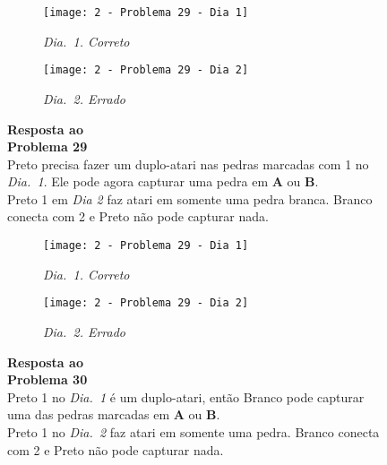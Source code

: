 \begin{SCfigure}[][h!]
    \begin{subfigure}[t]{.31\textwidth}
        \texttt{[image: 2 - Problema 29 - Dia 1]}
        \caption*{\emph{Dia.\@~1. Correto}}
    \end{subfigure}
    \hfill
    \begin{subfigure}[t]{.31\textwidth}
        \texttt{[image: 2 - Problema 29 - Dia 2]}
        \caption*{\emph{Dia.\@~2. Errado}}
    \end{subfigure}
    \hfill
    \caption*{\textbf{Resposta ao\\Problema 29}\\\vspace*{.25cm}Preto precisa fazer um duplo-atari  nas pedras marcadas com 1 no \emph{Dia.\@~1}. Ele pode agora capturar uma pedra em \textbf{A} ou \textbf{B}.\\\vspace*{.25cm}Preto 1 em \emph{Dia 2} faz atari em somente uma pedra branca. Branco conecta com 2 e Preto não pode capturar nada.}
\end{SCfigure}

\vfill

\begin{SCfigure}[][h!]
    \begin{subfigure}[t]{.31\textwidth}
        \texttt{[image: 2 - Problema 29 - Dia 1]}
        \caption*{\emph{Dia.\@~1. Correto}}
    \end{subfigure}
    \hfill
    \begin{subfigure}[t]{.31\textwidth}
        \texttt{[image: 2 - Problema 29 - Dia 2]}
        \caption*{\emph{Dia.\@~2. Errado}}
    \end{subfigure}
    \hfill
    \caption*{\textbf{Resposta ao\\Problema 30}\\\vspace*{.25cm}Preto 1 no \emph{Dia.\@~1} é um duplo-atari, então Branco pode capturar uma das pedras marcadas em \textbf{A} ou \textbf{B}.\\\vspace*{.25cm}Preto 1 no \emph{Dia.\@~2} faz atari em somente uma pedra. Branco conecta com 2 e Preto não pode capturar nada.}
\end{SCfigure}